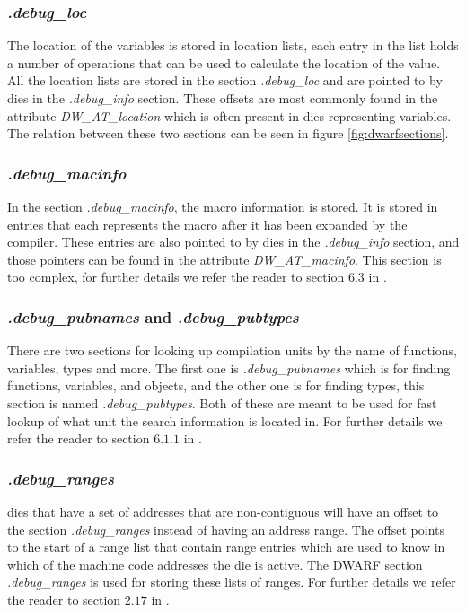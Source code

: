 \subsubsection{\emph{.debug\_loc}}
The location of the variables is stored in location lists, each entry in the list holds a number of operations that can be used to calculate the location of the value.
All the location lists are stored in the section \emph{.debug\_loc} and are pointed to by \glspl{die} in the \emph{.debug\_info} section.
These offsets are most commonly found in the attribute \emph{DW\_AT\_location} which is often present in \glspl{die} representing variables.
The relation between these two sections can be seen in figure \ref{fig:dwarfsections}.


\subsubsection{\emph{.debug\_macinfo}}
In the section \emph{.debug\_macinfo}, the macro information is stored.
It is stored in entries that each represents the macro after it has been expanded by the compiler.
These entries are also pointed to by \glspl{die} in the \emph{.debug\_info} section, and those pointers can be found in the attribute \emph{DW\_AT\_macinfo}.
This section is too complex, for further details we refer the reader to section $6.3$ in \cite{dwarf}.


\subsubsection{\emph{.debug\_pubnames} and \emph{.debug\_pubtypes}}
There are two sections for looking up compilation units by the name of functions, variables, types and more.
The first one is \emph{.debug\_pubnames} which is for finding functions, variables, and objects, and the other one is for finding types, this section is named \emph{.debug\_pubtypes}.
Both of these are meant to be used for fast lookup of what unit the search information is located in.
For further details we refer the reader to section $6.1.1$ in \cite{dwarf}.


\subsubsection{\emph{.debug\_ranges}}
\Glspl{die} that have a set of addresses that are non-contiguous will have an offset to the section \emph{.debug\_ranges} instead of having an address range.
The offset points to the start of a range list that contain range entries which are used to know in which of the machine code addresses the \gls{die} is active.
The \gls{DWARF} section \emph{.debug\_ranges} is used for storing these lists of ranges.
For further details we refer the reader to section $2.17$ in \cite{dwarf}.


